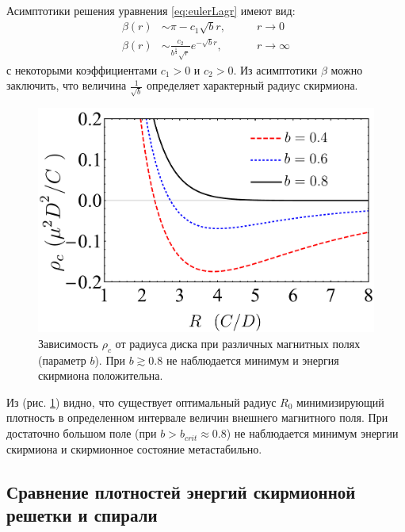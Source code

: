 \documentclass[a4paper,article,14pt]{extarticle}
\begin{document}
Асимптотики решения уравнения \eqref{eq:eulerLagr} имеют вид:
\begin{eqnarray*}
\label{eq:asympt_beta}
\beta(r) &\sim \pi - c_1 \sqrt{b} r ,\qquad &r \rightarrow 0 \\
\beta(r) &\sim \frac{c_2}{b^{\frac{1}{4}}\sqrt{r}} e^{-\sqrt{b} r} ,\qquad & r \rightarrow \infty
\end{eqnarray*}
с некоторыми коэффициентами $c_1>0$ и $c_2>0$. Из асимптотики $\beta$ можно заключить, что величина $\frac{1}{\sqrt{b}}$ определяет характерный радиус скирмиона.

\begin{figure}[h]
\centering\includegraphics[width=0.65\paperwidth]{images/plotDensity.pdf}
\caption{Зависимость $\rho _c$ от радиуса диска при различных магнитных полях (параметр $b$). При $b\gtrsim 0.8$ не наблюдается минимум и энергия скирмиона положительна.}
\label{pic:plotDensity}
\end{figure}
Из (рис. \ref{pic:plotDensity}) видно, что существует оптимальный радиус $R_0$ минимизирующий плотность в определенном интервале величин внешнего магнитного поля. При достаточно большом поле (при $b > b_{crit} \approx 0.8$) не наблюдается минимум энергии скирмиона и скирмионное состояние метастабильно.

\subsection{ Сравнение плотностей энергий скирмионной решетки и спирали }
\end{document}
